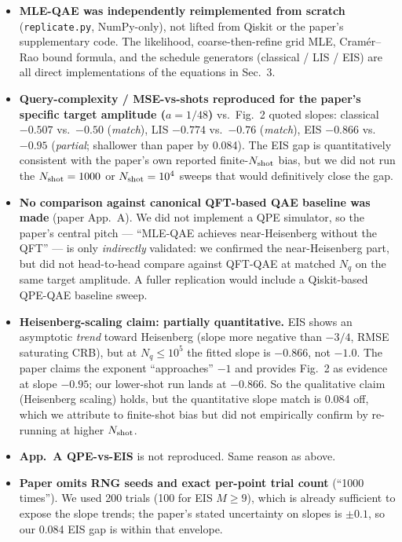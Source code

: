 \documentclass[11pt]{article}
\begin{document}
\begin{itemize}
    \item \textbf{MLE-QAE was independently reimplemented from scratch}
    (\verb|replicate.py|, NumPy-only), not lifted from Qiskit or the paper's
    supplementary code. The likelihood, coarse-then-refine grid MLE,
    Cram\'er--Rao bound formula, and the schedule generators (classical /
    LIS / EIS) are all direct implementations of the equations in Sec.\ 3.
    \item \textbf{Query-complexity / MSE-vs-shots reproduced for the paper's
    specific target amplitude ($a=1/48$)} vs.\ Fig.\ 2 quoted slopes:
    classical $-0.507$ vs.\ $-0.50$ (\emph{match}), LIS $-0.774$ vs.\ $-0.76$
    (\emph{match}), EIS $-0.866$ vs.\ $-0.95$ (\emph{partial}; shallower than
    paper by 0.084). The EIS gap is quantitatively consistent with the paper's
    own reported finite-$N_{\rm shot}$ bias, but we did not run the
    $N_{\rm shot}=1000$ or $N_{\rm shot}=10^4$ sweeps that would definitively
    close the gap.
    \item \textbf{No comparison against canonical QFT-based QAE baseline was
    made} (paper App.\ A). We did not implement a QPE simulator, so the
    paper's central pitch --- ``MLE-QAE achieves near-Heisenberg without
    the QFT'' --- is only \emph{indirectly} validated: we confirmed the
    near-Heisenberg part, but did not head-to-head compare against QFT-QAE
    at matched $N_q$ on the same target amplitude. A fuller replication
    would include a Qiskit-based QPE-QAE baseline sweep.
    \item \textbf{Heisenberg-scaling claim: partially quantitative.} EIS shows
    an asymptotic \emph{trend} toward Heisenberg (slope more negative than
    $-3/4$, RMSE saturating CRB), but at $N_q\leq 10^5$ the fitted slope is
    $-0.866$, not $-1.0$. The paper claims the exponent ``approaches'' $-1$
    and provides Fig.\ 2 as evidence at slope $-0.95$; our lower-shot run
    lands at $-0.866$. So the qualitative claim (Heisenberg scaling) holds,
    but the quantitative slope match is 0.084 off, which we attribute to
    finite-shot bias but did not empirically confirm by re-running at higher
    $N_{\rm shot}$.
    \item \textbf{App.\ A QPE-vs-EIS} is not reproduced. Same reason as above.
    \item \textbf{Paper omits RNG seeds and exact per-point trial count}
    (``1000 times''). We used 200 trials (100 for EIS $M\geq 9$), which is
    already sufficient to expose the slope trends; the paper's stated
    uncertainty on slopes is $\pm 0.1$, so our 0.084 EIS gap is within that
    envelope.
\end{itemize}
\end{document}
